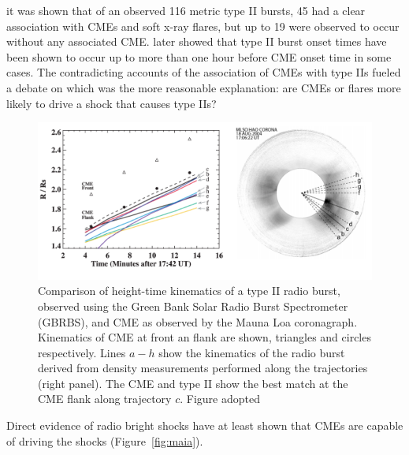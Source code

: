 it was shown that of an observed 116 metric type II bursts, 45 had a clear association with CMEs and soft x-ray flares, but up to 19 were observed to occur without any associated CME. \citep{classen2002} later showed that type II burst onset times have been shown to occur up to more than one hour before CME onset time in some cases. The contradicting accounts of the association of CMEs with type IIs fueled a debate on which was the more reasonable explanation: are CMEs or flares more likely to drive a shock that causes type IIs?  
\begin{figure}[t!]
\begin{center}
\includegraphics[scale=0.27, trim=0cm 1cm 0cm 1cm]{images/cho_trim.png}
\caption[Comparison of CME and type II height-time kinematics]{Comparison of height-time kinematics of a type II radio burst, observed using the Green Bank Solar Radio Burst Spectrometer (GBRBS), and CME as observed by the Mauna Loa coronagraph. Kinematics of CME at front an flank are shown, triangles and circles respectively.
Lines $a-h$ show the kinematics of the radio burst derived from density measurements performed along the trajectories (right panel). The CME and type II show the best match at the CME flank along trajectory $c$. Figure adopted \citep{cho2007}}
\label{fig:cho}
\end{center}
\end{figure}
Direct evidence of radio bright shocks have at least shown that CMEs are capable of driving the shocks \citep{maia2000} (Figure~\ref{fig:maia}).
